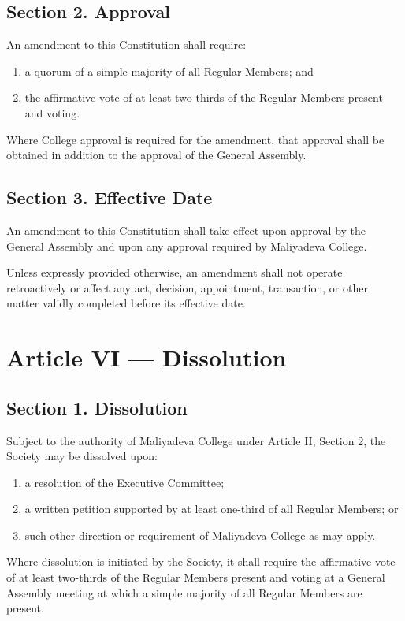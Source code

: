\documentclass[11pt,a4paper]{article}
\begin{document}
\subsection*{Section 2. Approval}
An amendment to this Constitution shall require:
\begin{enumerate}[leftmargin=*]
    \item a quorum of a simple majority of all Regular Members; and
    \item the affirmative vote of at least two-thirds of the Regular Members present and voting.
\end{enumerate}
Where College approval is required for the amendment, that approval shall be obtained in addition to the approval of the General Assembly.

\subsection*{Section 3. Effective Date}
An amendment to this Constitution shall take effect upon approval by the General Assembly and upon any approval required by Maliyadeva College.

Unless expressly provided otherwise, an amendment shall not operate retroactively or affect any act, decision, appointment, transaction, or other matter validly completed before its effective date.

\section*{Article VI --- Dissolution}

\subsection*{Section 1. Dissolution}
Subject to the authority of Maliyadeva College under Article II,
Section 2, the Society may be dissolved upon:
\begin{enumerate}[leftmargin=*]
    \item a resolution of the Executive Committee;
    \item a written petition supported by at least one-third of all
    Regular Members; or
    \item such other direction or requirement of Maliyadeva College as
    may apply.
\end{enumerate}

Where dissolution is initiated by the Society, it shall require the
affirmative vote of at least two-thirds of the Regular Members present
and voting at a General Assembly meeting at which a simple majority of
all Regular Members are present.
\end{document}
